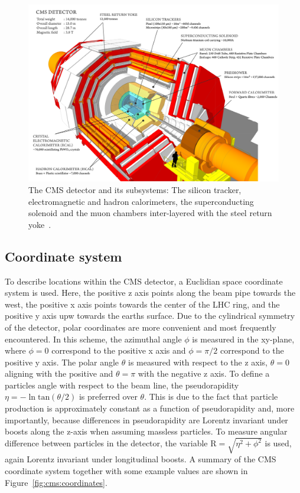 \begin{figure}[h] 
    \centering
    \includegraphics[width=1.0\textwidth]{figures/cms/CMS.png}
    \caption{The CMS detector and its subsystems: The silicon tracker, electromagnetic and hadron calorimeters, the superconducting solenoid and the muon chambers inter-layered with the steel return yoke~\cite{CMS}.}
    \label{fig:cms:CMS}
\end{figure}

\subsection{Coordinate system}
To describe locations within the CMS detector, a Euclidian space coordinate system is used. Here, the positive z axis points along the beam pipe towards the west, the positive x axis points towards the center of the LHC ring, and the positive y axis upw towards the earths surface. Due to the cylindrical symmetry of the detector, polar coordinates are more convenient and most frequently encountered. In this scheme, the azimuthal angle $\phi$ is measured in the xy-plane, where $\phi=0$ correspond to the positive x axis and $\phi=\pi/2$ correspond to the positive y axis. The polar angle $\theta$ is measured with respect to the z axis, $\theta=0$ aligning with the positive and $\theta=\pi$ with the negative z axis.
To define a particles angle with respect to the beam line, the pseudorapidity $\eta = -\ln{}\textrm{tan}(\theta/2)$ is preferred over $\theta$. This is due to the fact that particle production is approximately constant as a function of pseudorapidity and, more importantly, because differences in pseudorapidity are Lorentz invariant under boosts along the z-axis when assuming massless particles.
To measure angular difference between particles in the detector, the variable $\textrm{R}=\sqrt{\eta^2+\phi^2}$ is used, again Lorentz invariant under longitudinal boosts. A summary of the CMS coordinate system together with some example values are shown in Figure~\ref{fig:cms:coordinates}.


